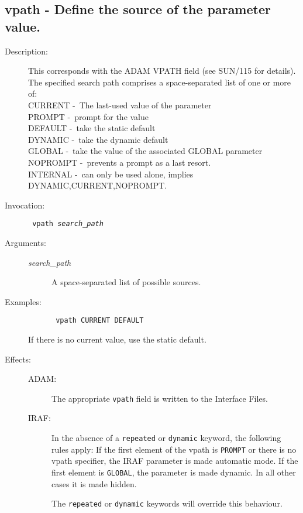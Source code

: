 \documentclass[twoside,11pt]{article}
\newcommand{\htmlref}[2]{#1}
\newcommand{\xref}[3]{#1}
\newcommand{\xlabel}[1]{}
\newcommand{\dash}{--}
\renewcommand{\dash}{-}
\newlength{\sstbannerlength}
\newlength{\sstcaptionlength}
\newlength{\sstexampleslength}
\newlength{\sstexampleswidth}
\newcommand{\sstroutine}[3]{
   \goodbreak
   \rule{\textwidth}{0.5mm}
   \vspace{-7ex}
   \newline
   \settowidth{\sstbannerlength}{{\Large {\bf #1}}}
   \setlength{\sstcaptionlength}{\textwidth}
   \setlength{\sstexampleslength}{\textwidth}
   \addtolength{\sstbannerlength}{0.5em}
   \addtolength{\sstcaptionlength}{-2.0\sstbannerlength}
   \addtolength{\sstcaptionlength}{-5.0pt}
   \settowidth{\sstexampleswidth}{{\bf Examples:}}
   \addtolength{\sstexampleslength}{-\sstexampleswidth}
   \parbox[t]{\sstbannerlength}{\flushleft{\Large {\bf #1}}}
   \parbox[t]{\sstcaptionlength}{\center{\Large #2}}
   \parbox[t]{\sstbannerlength}{\flushright{\Large {\bf #1}}}
   \begin{description}
      #3
   \end{description}
}
\newcommand{\sstdescription}[1]{\item[Description:] #1}
\newcommand{\sstinvocation}[1]{\item[Invocation:]\hspace{0.4em}{\tt #1}}
\newcommand{\ssteffects}[1]{
   \item[Effects:] \mbox{} \\
   \vspace{-3.5ex}
   \begin{description}
      #1
   \end{description}
}
\newcommand{\sstarguments}[1]{
   \item[Arguments:] \mbox{} \\
   \vspace{-3.5ex}
   \begin{description}
      #1
   \end{description}
}
\newcommand{\sstexamples}[1]{
   \item[Examples:] \mbox{}
      #1
}
\newcommand{\sstsubsection}[1]{ \item[{#1}] \mbox{} \\}
\newcommand{\sstexamplesubsection}[2]
{   \vspace{-5ex}
\begin{quote} \texttt{\begin{tabbing}
xxx\=xxx\=\kill
#1
\end{tabbing}}
\end{quote}
#2}
\newcommand{\ssttt}{\tt}
\renewcommand{\sstroutine}[3]{
      \subsection{#1\xlabel{#1}-\label{#1}#2}
      \begin{description}
         #3
      \end{description}
   }
\renewcommand{\sstdescription}[1]{\item[Description:]
      \begin{description}
         #1
      \end{description}
   }
\renewcommand{\sstinvocation}[1]{\item[Invocation:]
      \begin{description}
         {\ssttt #1}
      \end{description}
   }
\renewcommand{\ssteffects}[1]{
      \item[Effects:]
      \begin{description}
         #1
      \end{description}
   }
\renewcommand{\sstarguments}[1]{
      \item[Arguments:]
      \begin{description}
         #1
      \end{description}
   }
\renewcommand{\sstexamples}[1]{
      \item[Examples:]
      \begin{description}
         #1
      \end{description}
   }
\renewcommand{\sstsubsection}[1]{\item[{#1}]}
\renewcommand{\sstexamplesubsection}[2]{\item[] {\ssttt #1} \\ \item[#2]}
\begin{document}
\sstroutine{
   vpath
}{
   Define the source of the parameter value.
}{
   \sstdescription{
      This corresponds with the ADAM VPATH field (see 
      \xref{SUN/115}{sun115}{}
      for details).
      The specified search path comprises a space-separated list of one or 
      more of:\\
      CURRENT \dash\ The last-used value of the parameter\\
      PROMPT \dash\ prompt for the value\\
      DEFAULT \dash\ take the static default\\
      DYNAMIC \dash\ take the dynamic default\\
      GLOBAL \dash\ take the value of the associated GLOBAL parameter\\
      NOPROMPT \dash\ prevents a prompt as a last resort.\\
      INTERNAL \dash\ can only be used alone, implies DYNAMIC,CURRENT,NOPROMPT.
   }
   \sstinvocation{
      vpath \textit{search\_path}
   }
   \sstarguments{
      \sstsubsection{
         \textit{search\_path}
      }{
         A space-separated list of possible sources.
      }
   }
   \sstexamples{
      \sstexamplesubsection{
         vpath CURRENT DEFAULT
      }{
         If there is no current value, use the static default.
      }
   }
   \ssteffects{
      \sstsubsection{ADAM:}
         {The appropriate {\ssttt vpath} field is written to the Interface 
          Files.}
      \sstsubsection{IRAF:}{In the absence of a 
\htmlref{\texttt{repeated}}{repeated} or 
\htmlref{\texttt{dynamic}}{dynamic}
         keyword, the following rules apply: If the first element of the vpath
         is \texttt{PROMPT} or there is no vpath specifier, the IRAF parameter
         is made automatic mode. If the first element is \texttt{GLOBAL}, the
         parameter is made 
\htmlref{dynamic}{dynamic_key}.
         In all other cases it is made hidden.}

         The \texttt{repeated} or \texttt{dynamic} keywords will override this
         behaviour.

   }
}
\end{document}
